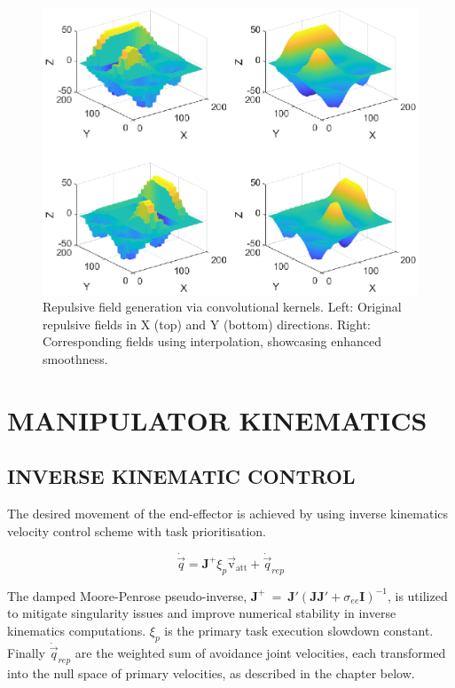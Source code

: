 \documentclass[letterpaper, 10 pt, conference]{ieeeconf}  %
\begin{document}
\begin{figure}
	\centering
	\includegraphics[width=1\linewidth]{non_and_interp_4_plots.eps} 
	\caption{Repulsive field generation via convolutional kernels. Left: Original repulsive fields in X (top) and Y (bottom) directions. Right: Corresponding fields using interpolation, showcasing enhanced smoothness.}
	\label{fig:interp-experiment}
\end{figure}

\section{MANIPULATOR KINEMATICS}

\subsection{INVERSE KINEMATIC CONTROL}

The desired movement of the end-effector is achieved by using inverse kinematics velocity control scheme with task prioritisation. 

\begin{equation}
	\dot{\vec{q}} = \mathbf{J}^+ \xi_{p} \mathrm{\vec{v}_{att}} + \dot{\vec{q}}_{rep}
\end{equation}

The damped Moore-Penrose pseudo-inverse, \(\mathbf{J}^+~=~\mathbf{J}'(\mathbf{J}\mathbf{J}' + \sigma_{ee} \mathbf{I})^{-1}\), is utilized to mitigate singularity issues and improve numerical stability in inverse kinematics computations. $\xi_{p}$ is the primary task execution slowdown constant. Finally $\dot{\vec{q}}_{rep}$ are the weighted sum of avoidance joint velocities, each transformed into the null space of primary velocities, as described in the chapter below. 
\end{document}
